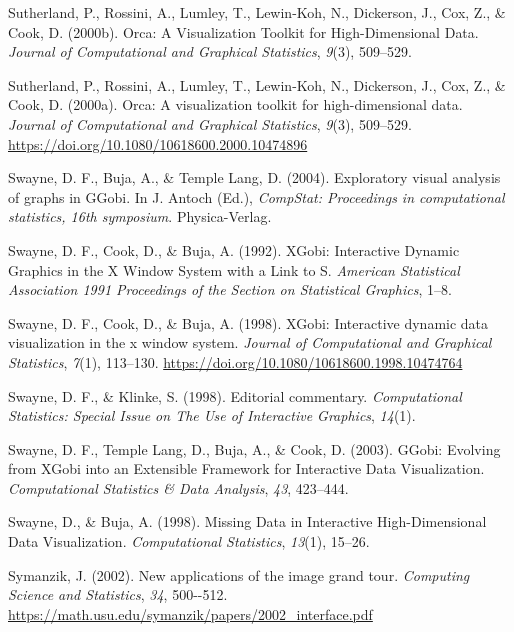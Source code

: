 \documentclass[
  letterpaper,
]{krantz}
\newlength{\cslhangindent}
\newenvironment{CSLReferences}[2] %
 {\begin{list}{}{%
  \setlength{\itemindent}{0pt}
  \setlength{\leftmargin}{0pt}
  \setlength{\parsep}{0pt}
  \ifodd #1
   \setlength{\leftmargin}{\cslhangindent}
   \setlength{\itemindent}{-1\cslhangindent}
  \fi
  \setlength{\itemsep}{#2\baselineskip}}}
 {\end{list}}
\begin{document}
\begin{CSLReferences}{1}{0}
Sutherland, P., Rossini, A., Lumley, T., Lewin-Koh, N., Dickerson, J.,
Cox, Z., \& Cook, D. (2000b). Orca: {A} {V}isualization {T}oolkit for
{H}igh-{D}imensional {D}ata. \emph{Journal of Computational and
Graphical Statistics}, \emph{9}(3), 509--529.

Sutherland, P., Rossini, A., Lumley, T., Lewin-Koh, N., Dickerson, J.,
Cox, Z., \& Cook, D. (2000a). Orca: A visualization toolkit for
high-dimensional data. \emph{Journal of Computational and Graphical
Statistics}, \emph{9}(3), 509--529.
\url{https://doi.org/10.1080/10618600.2000.10474896}

Swayne, D. F., Buja, A., \& Temple Lang, D. (2004). Exploratory visual
analysis of graphs in {GG}obi. In J. Antoch (Ed.), \emph{CompStat:
Proceedings in computational statistics, 16th symposium}.
Physica-Verlag.

Swayne, D. F., Cook, D., \& Buja, A. (1992). {XG}obi: {I}nteractive
{D}ynamic {G}raphics in the {X} {W}indow {S}ystem with a {L}ink to {S}.
\emph{American Statistical Association 1991 Proceedings of the Section
on Statistical Graphics}, 1--8.

Swayne, D. F., Cook, D., \& Buja, A. (1998). XGobi: Interactive dynamic
data visualization in the x window system. \emph{Journal of
Computational and Graphical Statistics}, \emph{7}(1), 113--130.
\url{https://doi.org/10.1080/10618600.1998.10474764}

Swayne, D. F., \& Klinke, S. (1998). Editorial commentary.
\emph{Computational Statistics: Special Issue on The Use of Interactive
Graphics}, \emph{14}(1).

Swayne, D. F., Temple Lang, D., Buja, A., \& Cook, D. (2003). {GG}obi:
{E}volving from {XG}obi into an {E}xtensible {F}ramework for
{I}nteractive {D}ata {V}isualization. \emph{Computational Statistics \&
Data Analysis}, \emph{43}, 423--444.

Swayne, D., \& Buja, A. (1998). {M}issing {D}ata in {I}nteractive
{H}igh-{D}imensional {D}ata {V}isualization. \emph{Computational
Statistics}, \emph{13}(1), 15--26.

Symanzik, J. (2002). New applications of the image grand tour.
\emph{Computing Science and Statistics}, \emph{34}, 500-\/-512.
\url{https://math.usu.edu/symanzik/papers/2002_interface.pdf}


\end{CSLReferences}
\end{document}
